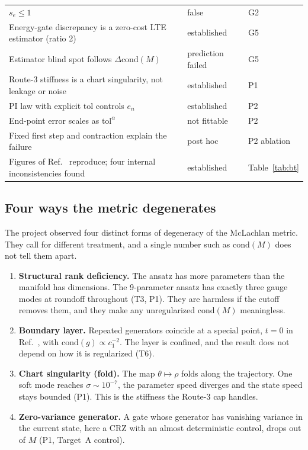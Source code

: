 \documentclass[aps,pra,reprint,superscriptaddress,nofootinbib]{revtex4-2}
\newcommand{\cond}{\mathrm{cond}}
\newcommand{\tol}{\mathrm{tol}}
\begin{document}
\begin{table}[t]
\begin{ruledtabular}
\begin{tabular}{p{9.2cm}p{2.6cm}p{3.6cm}}
$s_e\le1$ & false & G2 \\
Energy-gate discrepancy is a zero-cost LTE estimator (ratio 2) & established & G5 \\
Estimator blind spot follows $\Delta\cond(M)$ & prediction failed & G5 \\
Route-3 stiffness is a chart singularity, not leakage or noise & established & P1 \\
PI law with explicit $\tol$ controls $e_n$ & established & P2 \\
End-point error scales as $\tol^{\alpha}$ & not fittable & P2 \\
Fixed first step and contraction explain the failure & post hoc & P2 ablation \\
Figures of Ref.~\cite{BeyondTrot2026} reproduce; four internal inconsistencies found & established & Table~\ref{tab:bt} \\
\end{tabular}
\end{ruledtabular}
\end{table}

\subsection{Four ways the metric degenerates}

The project observed four distinct forms of degeneracy of the McLachlan metric. They
call for different treatment, and a single number such as $\cond(M)$ does not tell them apart.
\begin{enumerate}
\setlength\itemsep{0pt}
\item \textbf{Structural rank deficiency.} The ansatz has more parameters than the manifold has
  dimensions. The 9-parameter ansatz has exactly three gauge modes at roundoff throughout
  (T3, P1). They are harmless if the cutoff removes them, and they make any unregularized
  $\cond(M)$ meaningless.
\item \textbf{Boundary layer.} Repeated generators coincide at a special point, $t=0$ in
  Ref.~\cite{BeyondTrot2026}, with $\cond(g)\propto c_1^{-2}$. The layer is confined, and the
  result does not depend on how it is regularized (T6).
\item \textbf{Chart singularity (fold).} The map $\theta\mapsto\rho$ folds along the
  trajectory. One soft mode reaches $\sigma\sim10^{-7}$, the parameter speed diverges and the
  state speed stays bounded (P1). This is the stiffness the Route-3 cap handles.
\item \textbf{Zero-variance generator.} A gate whose generator has vanishing variance in the
  current state, here a CRZ with an almost deterministic control, drops out of $M$ (P1,
  Target~A control).
\end{enumerate}
\end{document}
